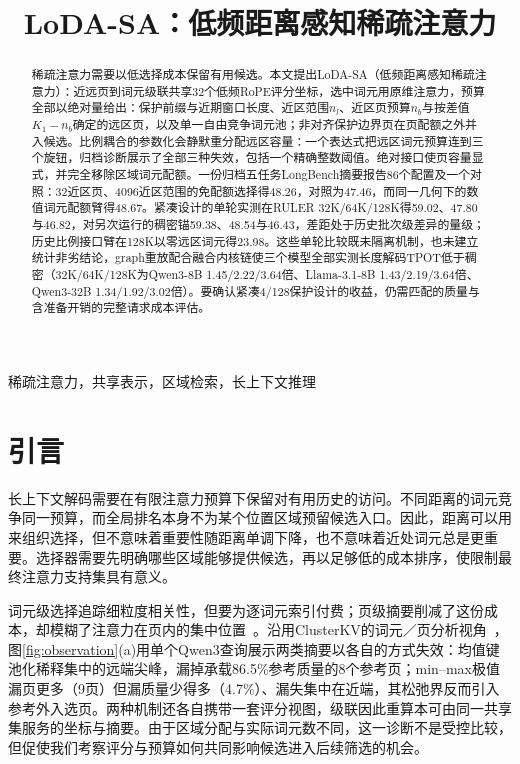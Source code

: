 \documentclass[conference,9pt,letterpaper]{IEEEtran}
\title{LoDA-SA：低频距离感知稀疏注意力}
\author{\IEEEauthorblockN{匿名作者}}
\begin{document}
\maketitle
\begin{abstract}
稀疏注意力需要以低选择成本保留有用候选。本文提出LoDA-SA（低频距离感知稀疏注意力）：近远页到词元级联共享32个低频RoPE评分坐标，选中词元用原维注意力，预算全部以绝对量给出：保护前缀与近期窗口长度、近区范围$n_l$、近区页预算$n_b$与按差值$K_1-n_b$确定的远区页，以及单一自由竞争词元池；非对齐保护边界页在页配额之外并入候选。比例耦合的参数化会静默重分配远区容量：一个表达式把远区词元预算连到三个旋钮，归档诊断展示了全部三种失效，包括一个精确整数阈值。绝对接口使页容量显式，并完全移除区域词元配额。一份归档五任务LongBench摘要报告86个配置及一个对照：32近区页、4096近区范围的免配额选择得48.26，对照为47.46，而同一几何下的数值词元配额臂得48.67。紧凑设计的单轮实测在RULER 32K/64K/128K得59.02、47.80与46.82，对另次运行的稠密锚59.38、48.54与46.43，差距处于历史批次级差异的量级；历史比例接口臂在128K以零远区词元得23.98。这些单轮比较既未隔离机制，也未建立统计非劣结论，graph重放配合融合内核链使三个模型全部实测长度解码TPOT低于稠密（32K/64K/128K为Qwen3-8B 1.45/2.22/3.64倍、Llama-3.1-8B 1.43/2.19/3.64倍、Qwen3-32B 1.34/1.92/3.02倍）。要确认紧凑4/128保护设计的收益，仍需匹配的质量与含准备开销的完整请求成本评估。

\end{abstract}
\begin{IEEEkeywords}稀疏注意力，共享表示，区域检索，长上下文推理\end{IEEEkeywords}

\section{引言}
长上下文解码需要在有限注意力预算下保留对有用历史的访问。不同距离的词元竞争同一预算，而全局排名本身不为某个位置区域预留候选入口。因此，距离可以用来组织选择，但不意味着重要性随距离单调下降，也不意味着近处词元总是更重要。选择器需要先明确哪些区域能够提供候选，再以足够低的成本排序，使限制最终注意力支持集具有意义。

词元级选择追踪细粒度相关性，但要为逐词元索引付费；页级摘要削减了这份成本，却模糊了注意力在页内的集中位置~\cite{asynctls}。沿用ClusterKV的词元／页分析视角~\cite{clusterkv}，图\ref{fig:observation}(a)用单个Qwen3查询展示两类摘要以各自的方式失效：均值键池化稀释集中的远端尖峰，漏掉承载86.5\%参考质量的8个参考页；min--max极值漏页更多（9页）但漏质量少得多（4.7\%）、漏失集中在近端，其松弛界反而引入参考外入选页。两种机制还各自携带一套评分视图，级联因此重算本可由同一共享集服务的坐标与摘要。由于区域分配与实际词元数不同，这一诊断不是受控比较，但促使我们考察评分与预算如何共同影响候选进入后续筛选的机会。
\end{document}
